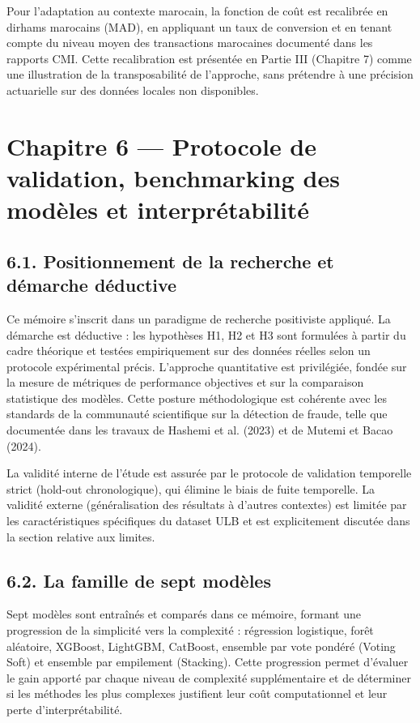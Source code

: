 Pour l'adaptation au contexte marocain, la fonction de coût est recalibrée en dirhams marocains (MAD), en appliquant un taux de conversion et en tenant compte du niveau moyen des transactions marocaines documenté dans les rapports CMI. Cette recalibration est présentée en Partie III (Chapitre 7) comme une illustration de la transposabilité de l'approche, sans prétendre à une précision actuarielle sur des données locales non disponibles.

\chapter{Chapitre 6 — Protocole de validation, benchmarking des modèles et interprétabilité}

\section{6.1. Positionnement de la recherche et démarche déductive}

Ce mémoire s'inscrit dans un paradigme de recherche positiviste appliqué. La démarche est déductive : les hypothèses H1, H2 et H3 sont formulées à partir du cadre théorique et testées empiriquement sur des données réelles selon un protocole expérimental précis. L'approche quantitative est privilégiée, fondée sur la mesure de métriques de performance objectives et sur la comparaison statistique des modèles. Cette posture méthodologique est cohérente avec les standards de la communauté scientifique sur la détection de fraude, telle que documentée dans les travaux de Hashemi et al. (2023) et de Mutemi et Bacao (2024).

La validité interne de l'étude est assurée par le protocole de validation temporelle strict (hold-out chronologique), qui élimine le biais de fuite temporelle. La validité externe (généralisation des résultats à d'autres contextes) est limitée par les caractéristiques spécifiques du dataset ULB et est explicitement discutée dans la section relative aux limites.

\section{6.2. La famille de sept modèles}

Sept modèles sont entraînés et comparés dans ce mémoire, formant une progression de la simplicité vers la complexité : régression logistique, forêt aléatoire, XGBoost, LightGBM, CatBoost, ensemble par vote pondéré (Voting Soft) et ensemble par empilement (Stacking). Cette progression permet d'évaluer le gain apporté par chaque niveau de complexité supplémentaire et de déterminer si les méthodes les plus complexes justifient leur coût computationnel et leur perte d'interprétabilité.

